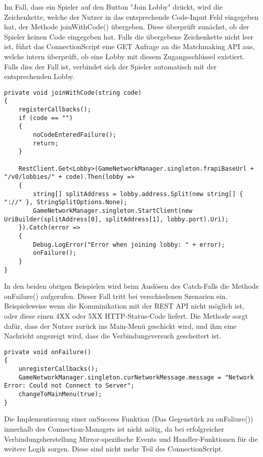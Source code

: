 Im Fall, dass ein Spieler auf den Button "Join Lobby" drückt, wird die Zeichenkette, welche der Nutzer in das entsprechende Code-Input Feld eingegeben hat, der Methode joinWithCode() übergeben. Diese überprüft zunächst, ob der Spieler keinen Code eingegeben hat. Falls die übergebene Zeichenkette nicht leer ist, führt das ConnectionScript eine GET Anfrage an die Matchmaking API aus, welche intern überprüft, ob eine Lobby mit diesem Zugangsschlüssel existiert. Falls dies der Fall ist, verbindet sich der Spieler automatisch mit der entsprechenden Lobby. 

\begin{lstlisting}[caption= ConnectionScript.cs joinWithCode()]
private void joinWithCode(string code)
{
	registerCallbacks();
	if (code == "")
	{
		noCodeEnteredFailure();
		return;
	}
			
	RestClient.Get<Lobby>(GameNetworkManager.singleton.frapiBaseUrl + "/v0/lobbies/" + code).Then(lobby =>
	{
		string[] splitAddress = lobby.address.Split(new string[] { "://" }, StringSplitOptions.None);
		GameNetworkManager.singleton.StartClient(new UriBuilder(splitAddress[0], splitAddress[1], lobby.port).Uri);
	}).Catch(error =>
	{
		Debug.LogError("Error when joining lobby: " + error);
		onFailure();
	}
}
\end{lstlisting}

In den beiden obrigen Beispielen wird beim Auslösen des Catch-Falls die Methode onFailure() aufgerufen. Dieser Fall tritt bei verschiedenen Szenarien ein. Beispielsweise wenn die Komminikation mit der REST API nicht möglich ist, oder diese einen 4XX oder 5XX HTTP-Status-Code liefert. Die Methode sorgt dafür, dass der Nutzer zurück ins Main-Menü geschickt wird, und ihm eine Nachricht angezeigt wird, dass die Verbindungsversuch gescheitert ist.

\begin{lstlisting}[caption= ConnectionScript.cs onFailure()]
private void onFailure()
{
	unregisterCallbacks();
	GameNetworkManager.singleton.curNetworkMessage.message = "Network Error: Could not Connect to Server";
	changeToMainMenu(true);
}

\end{lstlisting}

Die Implementierung einer onSuccess Funktion (Das Gegenstück zu onFaliure()) innerhalb des Connection-Managers ist nicht nötig, da bei erfolgreicher Verbindungsherstellung Mirror-spezifische Events und Handler-Funktionen für die weitere Logik sorgen. Diese sind nicht mehr Teil des ConnectionScript.

